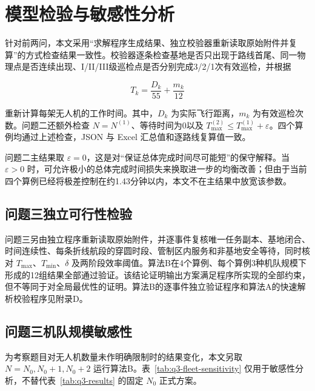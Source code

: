 \documentclass[UTF8,a4paper,12pt]{ctexart}
\numberwithin{equation}{section}
\numberwithin{equation}{section}
\begin{document}
\section{模型检验与敏感性分析}
针对前两问，本文采用“求解程序生成结果、独立校验器重新读取原始附件并复算”的方式检查结果一致性。校验器逐条检查基地是否只出现于路线首尾、同一物理点是否连续出现、I/II/III级巡检点是否分别完成3/2/1次有效巡检，并根据

\[
  T_k=\frac{D_k}{55}+\frac{m_k}{12}
\]

重新计算每架无人机的工作时间。其中，\(D_k\) 为实际飞行距离，\(m_k\) 为有效巡检次数。问题二还额外检查 \(N=N^{(1)}\)、等待时间为0以及 \(T_{\max}^{(2)}\leq T_{\max}^{(1)}+\varepsilon\)。四个算例均通过上述检查，JSON 与 Excel 汇总值和逐路线复算值一致。

问题二主结果取 \(\varepsilon=0\)，这是对“保证总体完成时间尽可能短”的保守解释。当 \(\varepsilon>0\) 时，可允许极小的总体完成时间损失来换取进一步的均衡改善；但由于当前四个算例已经将极差控制在约1.43分钟以内，本文不在主结果中放宽该参数。

\subsection{问题三独立可行性检验}

问题三另由独立程序重新读取原始附件，并逐事件复核唯一任务副本、基地闭合、时间连续性、每条折线航段的穿圆时段、管制区内服务和非基地安全等待，同时核对 $T_{\max}$、$T_{\min}$、$\delta$ 及两阶段效率阈值。算法B在4个算例、每个算例3种机队规模下形成的12组结果全部通过验证。该结论证明输出方案满足程序所实现的全部约束，但不等同于对全局最优性的证明。算法B的逐事件独立验证程序和算法A的快速解析校验程序见附录D。

\clearpage
\subsection{问题三机队规模敏感性}

为考察题目对无人机数量未作明确限制时的结果变化，本文另取 $N=N_0,N_0+1,N_0+2$ 运行算法B。表~\ref{tab:q3-fleet-sensitivity} 仅用于敏感性分析，不替代表~\ref{tab:q3-results} 的固定 $N_0$ 正式方案。
\end{document}
